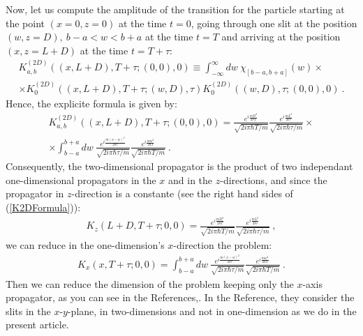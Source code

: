 \documentclass[12pt]{article}   %
\begin{document}
Now, let us compute the amplitude of the transition for the particle 
starting at the point $(x=0,z=0)$ at the time $t=0$,
going through one slit at the position $(w,z=D),\ b-a<w<b+a$ at the time $t=T$
and arriving at the position $(x,z=L+D)$ at the time $t=T+\tau$: 
\begin{multline*}
K_{a,b}^{(2D)}((x,L+D),T+\tau; (0,0),0)
\equiv\int_{-\infty}^{\infty}dw\ \chi_{[b-a,b+a]}(w)\times
\\ \times K_0^{(2D)}\!\!\left((x,L+D),T+\tau;(w,D),\tau\right)K_0^{(2D)}\!\!\left((w,D),\tau;(0,0),0\right)\ .
\end{multline*}
Hence, the explicite formula is given by:
\begin{multline}\label{K2DFormula}
K_{a,b}^{(2D)}((x,L+D), T+\tau;(0,0),0)=
\frac{e^{i\frac{mD^2}{2\hbar T}}}{\sqrt{2i\pi\hbar T/m}} 
\frac{e^{i\frac{m L^2}{2\hbar\tau}}}{\sqrt{2i\pi\hbar\tau/m}} \times\\
\times \int_{b-a}^{b+a}dw\ \frac{e^{i\frac{m (x-w)^2}{2\hbar\tau}}}{\sqrt{2i\pi\hbar\tau/m}}
\frac{e^{i\frac{m w^2}{2\hbar T}}}{\sqrt{2i\pi\hbar T/m}}\ .
\end{multline}
Consequently, the two-dimensional propagator is the product of two independant 
one-dimensional propagators in the $x$ and in the $z$-directions, 
and since the propagator in $z$-direction is a constante 
(see the right hand sides of (\ref{K2DFormula})):
\begin{eqnarray}\label{Kz}
K_z(L+D,T+\tau;0,0)=\frac{e^{i\frac{mD^2}{2\hbar T}}}{\sqrt{2i\pi\hbar T/m}}
\frac{e^{i\frac{m L^2}{2\hbar\tau}}}{\sqrt{2i\pi\hbar\tau/m}}\ ,
\end{eqnarray}
we can reduce in the one-dimension's $x$-direction the problem:
\begin{eqnarray}\label{Kx}
K_x(x,T+\tau;0,0)=\int_{b-a}^{b+a}dw\ \frac{e^{i\frac{m (x-w)^2}{2\hbar\tau}}}{\sqrt{2i\pi\hbar\tau/m}}
\frac{e^{i\frac{m w^2}{2\hbar T}}}{\sqrt{2i\pi\hbar T/m}}\ .
\end{eqnarray}
Then we can reduce the dimension of the problem keeping only the $x$-axis
propagator, as you can see in the References\cite{FH},\cite{Frabboni}.
In the Reference,\cite{Frabboni} they consider the slits in 
the $x$-$y$-plane, in two-dimensions and not in one-dimension 
as we do in the present article.
\end{document}
